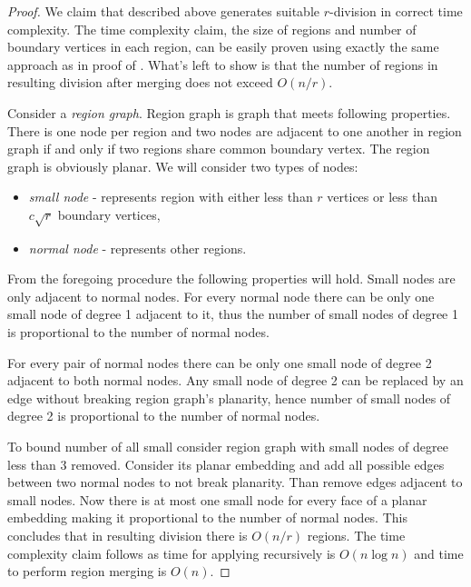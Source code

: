 \begin{proof}

We claim that  described above generates suitable $r$-division in correct time complexity. The time complexity claim, the size of regions and number of boundary vertices in each region, can be easily proven using exactly the same approach as in proof of . What's left to show is that the number of regions in resulting division after merging does not exceed $O(n/r)$.

Consider a \emph{region graph}. Region graph is graph that meets following properties. There is one node per region and  two nodes are adjacent to one another in region graph if and only if two regions share common boundary vertex. The region graph is obviously planar. We will consider two types of nodes:
\begin{itemize}
    \item \emph{small node} - represents region with either less than $r$ vertices or less than $c \sqrt{r}$ boundary vertices,
    \item \emph{normal node} - represents other regions.
\end{itemize}

From the foregoing procedure the following properties will hold. Small nodes are only adjacent to normal nodes. For every normal node there can be only one small node of degree 1 adjacent to it, thus the number of small nodes of degree 1 is proportional to the number of normal nodes.

For every pair of normal nodes there can be only one small node of degree 2 adjacent to both normal nodes. Any small node of degree 2 can be replaced by an edge without breaking region graph's planarity, hence number of small nodes of degree 2 is proportional to the number of normal nodes.

To bound number of all small consider region graph with small nodes of degree less than 3 removed. Consider its planar embedding and add all possible edges between two normal nodes to not break planarity. Than remove edges adjacent to small nodes. Now there is at most one small node for every face of a planar embedding making it proportional to the number of normal nodes. This concludes that in resulting division there is $O(n/r)$ regions. The time complexity claim follows as time for applying  recursively is $O(n \log{n})$ and time to perform region merging is $O(n)$.
    
\end{proof}